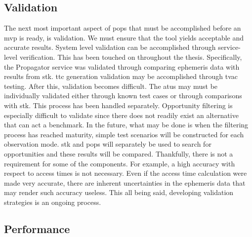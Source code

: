 \subsection{Validation}

The next most important aspect of \gls{pops} that must be accomplished before
an \gls{mvp} is ready, is validation. We must ensure that the tool yields
acceptable and accurate results. System level validation can be accomplished
through service-level verification. This has been touched on throughout the
thesis. Specifically, the Propagator service was validated through comparing
ephemeris data with results from \gls{stk}. \gls{ttc} generation validation may
be accomplished through \gls{tvac} testing. After this, validation becomes
difficult. The \glspl{atu} may must be individually validated either through
known test cases or through comparisons with \gls{stk}. This process has been
handled separately. Opportunity filtering is especially difficult to validate
since there does not readily exist an alternative that can act a benchmark. In
the future, what may be done is when the filtering process has reached
maturity, simple test scenarios will be constructed for each observation mode.
\gls{stk} and \gls{pops} will separately be used to search for opportunities
and these results will be compared. Thankfully, there is not a requirement for
some of the components. For example, a high accuracy with respect to access
times is not necessary. Even if the access time calculation were made very
accurate, there are inherent uncertainties in the ephemeris data that may
render such accuracy useless. This all being said, developing validation
strategies is an ongoing process.
 
%

\subsection{Performance}

